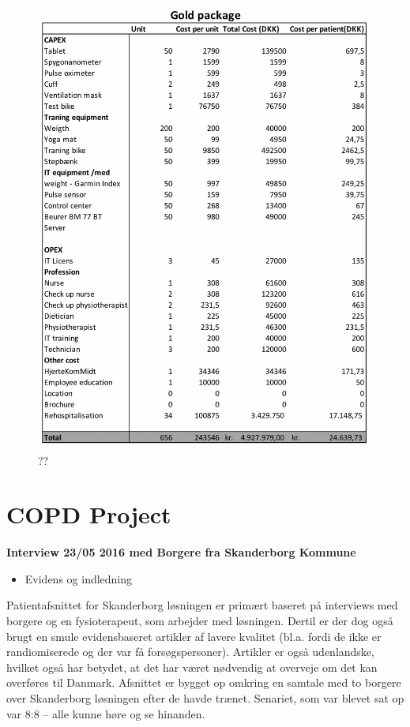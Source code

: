 \begin{figure}[H]
\centering
\includegraphics[width=1\textwidth]{Figure/Gold.png}
\caption{??}
\label{fig: Gold}
\end{figure} 


\chapter{COPD Project}
\textbf{Interview 23/05 2016 med Borgere fra Skanderborg Kommune}

\begin{itemize}
	\item Evidens og indledning
\end{itemize}
Patientafsnittet for Skanderborg løsningen er primært baseret på interviews med borgere og en fysioterapeut, som arbejder med løsningen. Dertil er der dog også brugt en smule evidensbaseret artikler af lavere kvalitet (bl.a. fordi de ikke er randiomiserede og der var få forsøgspersoner). Artikler er også udenlandske, hvilket også har betydet, at det har været nødvendig at overveje om det kan overføres til Danmark. Afsnittet er bygget op omkring en samtale med to borgere over Skanderborg løsningen efter de havde trænet. Senariet, som var blevet sat op var 8:8 – alle kunne høre og se hinanden.

